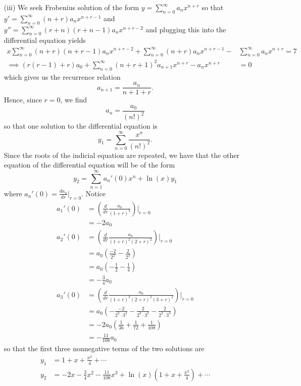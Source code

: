 \documentclass{article}
\begin{document}
\begin{itemize}
\begin{itemize}
\begin{itemize}
            \item[(iii)] We seek Frobenius solution of the form $y = \sum_{n = 0}^{\infty} a_n x^{n + r}$ so that $y' = \sum_{n = 0}^{\infty} (n + r)a_n x^{n + r - 1}$ and $y'' = \sum_{n = 0}^{\infty} (r + n)(r + n - 1)a_nx^{n + r - 2}$ and plugging this into the differential equation yields
            \begin{align*}
                x\sum_{n = 0}^{\infty} (n + r)(n + r - 1)a_n x^{n + r - 2} + \sum_{n = 0}^{\infty} (n + r)a_n x^{n + r - 1} - &\sum_{n = 0}^{\infty} a_n x^{n + r} = 7\\
                \implies (r(r - 1) + r)a_0 + \sum_{n = 0}^{\infty} (n + r + 1)^2a_{n+1}x^{n + r} - a_nx^{n + r} &= 0
            \end{align*}
            which gives us the recurrence relation
            \[a_{n + 1} = \frac{a_n}{n + 1 + r}.\]
            Hence, since $r = 0$, we find
            \[a_n = \frac{a_0}{(n!)^2}\]
            so that one solution to the differential equation is 
            \[y_1 = \sum_{n = 0}^{\infty} \frac{x^n}{(n!)^2}.\]
            Since the roots of the indicial equation are repeated, we have that the other equation of the differential equation will be of the form
            \[y_2 = \sum_{n = 1}^{\infty} a_n'(0) x^n + \ln(x) y_1\]
            where $a_n'(0) = \frac{da_n}{dr}\big|_{r = 0}$. Notice
            \begin{align*}
                a_1'(0) &= \left(\frac{d}{dr}\frac{a_0}{(1 + r)^2}\right)\bigg|_{r = 0}\\
                &= -2a_0\\
                a_2'(0) &= \left(\frac{d}{dr}\frac{a_0}{(1 + r)^2(2 + r)^2}\right)\bigg|_{r = 0}\\
                &= a_0\left(\frac{-2}{2^2} - \frac{2}{2^3}\right)\\
                &= a_0\left(-\frac{1}{2} - \frac{1}{4}\right)\\
                &= -\frac{3}{4}a_0\\
                a_3'(0) &= \left(\frac{d}{dr}\frac{a_0}{(1 + r)^2(2 + r)^2(3 + r)^2}\right)\bigg|_{r = 0}\\
                &= a_0\left(-\frac{-2}{2^2\cdot 3^2} - \frac{2}{2^3\cdot 3^2} - \frac{2}{2^2\cdot 3^3}\right)\\
                &= -2a_0\left(\frac{1}{36} + \frac{1}{72} + \frac{1}{108}\right)\\
                &= -\frac{11}{108}a_0
            \end{align*}
            so that the first three nonnegative terms of the two solutions are
            \begin{align*}
                y_1 &= 1 + x + \frac{x^2}{4} + \cdots\\
                y_2 &= -2x - \frac{3}{4}x^2 - \frac{11}{108}x^3 + \ln(x)\left(1 + x + \frac{x^2}{4}\right) + \cdots
            \end{align*}
        \end{itemize}


\end{itemize}
\end{itemize}
\end{document}
